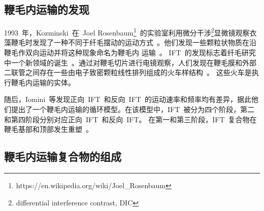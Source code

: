 \subsection{鞭毛内运输的发现}
1993\ 年，Kozminski\ 在\ Joel Rosenbaum\footnote{https://en.wikipedia.org/wiki/Joel\_Rosenbaum}\ 的实验室利用微分干涉\footnote{differential interference contrast, DIC}显微镜观察衣藻鞭毛时发现了一种不同于纤毛摆动的运动方式\ \citep{Kozminski1993}。他们发现一些颗粒状物质在沿鞭毛作双向运动并将这种现象命名为鞭毛内
运输\ \citep{Kozminski1993}。 IFT\ 的发现标志着纤毛研究中一个新领域的诞生\ \citep{Satir2017}。通过对鞭毛切片进行电镜观察，人们发现在鞭毛膜和外部二联管之间存在一些由电子致密颗粒线性排列组成的火车样结构\ \citep{Kozminski1993}。 这些火车是执行鞭毛内运输的实体。

随后，Iomini\ 等发现正向\ IFT\ 和反向\ IFT\ 的运动速率和频率均有差异，据此他们提出了一个鞭毛内运输的循环模型。在该模型中，IFT\ 被分为四个阶段，第二和第四阶段分别对应正向\ IFT\ 和反向\ IFT。 在第一和第三阶段，IFT\ 复合物在鞭毛基部和顶部发生重塑\ \citep{Iomini2001,Morga2013}。

\subsection{鞭毛内运输复合物的组成}

